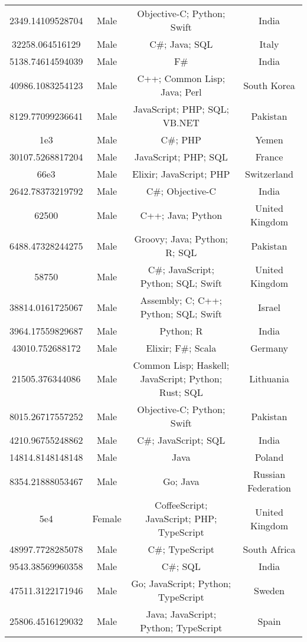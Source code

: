 \begin{center}
\begin{tabular}{ |c|c|c|c| }
2349.14109528704  &  Male  &  Objective-C; Python; Swift  &  India  \\ 
32258.064516129  &  Male  &  C\#; Java; SQL  &  Italy  \\ 
5138.74614594039  &  Male  &  F\#  &  India  \\ 
40986.1083254123  &  Male  &  C++; Common Lisp; Java; Perl  &  South Korea  \\ 
8129.77099236641  &  Male  &  JavaScript; PHP; SQL; VB.NET  &  Pakistan  \\ 
1e3  &  Male  &  C\#; PHP  &  Yemen  \\ 
30107.5268817204  &  Male  &  JavaScript; PHP; SQL  &  France  \\ 
66e3  &  Male  &  Elixir; JavaScript; PHP  &  Switzerland  \\ 
2642.78373219792  &  Male  &  C\#; Objective-C  &  India  \\ 
62500  &  Male  &  C++; Java; Python  &  United Kingdom  \\ 
6488.47328244275  &  Male  &  Groovy; Java; Python; R; SQL  &  Pakistan  \\ 
58750  &  Male  &  C\#; JavaScript; Python; SQL; Swift  &  United Kingdom  \\ 
38814.0161725067  &  Male  &  Assembly; C; C++; Python; SQL; Swift  &  Israel  \\ 
3964.17559829687  &  Male  &  Python; R  &  India  \\ 
43010.752688172  &  Male  &  Elixir; F\#; Scala  &  Germany  \\ 
21505.376344086  &  Male  &  Common Lisp; Haskell; JavaScript; Python; Rust; SQL  &  Lithuania  \\ 
8015.26717557252  &  Male  &  Objective-C; Python; Swift  &  Pakistan  \\ 
4210.96755248862  &  Male  &  C\#; JavaScript; SQL  &  India  \\ 
14814.8148148148  &  Male  &  Java  &  Poland  \\ 
8354.21888053467  &  Male  &  Go; Java  &  Russian Federation  \\ 
5e4  &  Female  &  CoffeeScript; JavaScript; PHP; TypeScript  &  United Kingdom  \\ 
48997.7728285078  &  Male  &  C\#; TypeScript  &  South Africa  \\ 
9543.38569960358  &  Male  &  C\#; SQL  &  India  \\ 
47511.3122171946  &  Male  &  Go; JavaScript; Python; TypeScript  &  Sweden  \\ 
25806.4516129032  &  Male  &  Java; JavaScript; Python; TypeScript  &  Spain  \\ 

\end{tabular}
\end{center}
